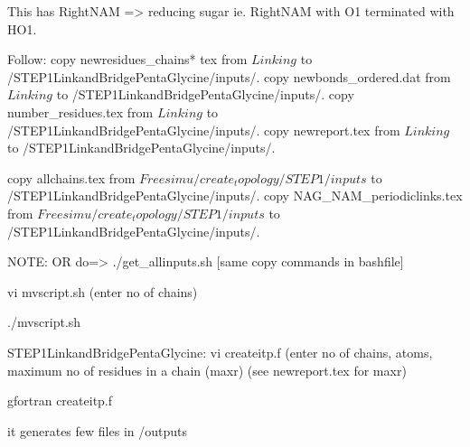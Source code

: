 This has RightNAM => reducing sugar ie. RightNAM with O1 terminated with HO1.

Follow:
copy newresidues_chains* tex          from $Linking$ to /STEP1LinkandBridgePentaGlycine/inputs/. 
copy newbonds_ordered.dat             from $Linking$ to /STEP1LinkandBridgePentaGlycine/inputs/.
copy number_residues.tex              from $Linking$ to /STEP1LinkandBridgePentaGlycine/inputs/.
copy newreport.tex                    from $Linking$ to /STEP1LinkandBridgePentaGlycine/inputs/.

copy allchains.tex                    from $Freesimu/create_topology/STEP1/inputs$  to  /STEP1LinkandBridgePentaGlycine/inputs/.
copy NAG_NAM_periodiclinks.tex        from $Freesimu/create_topology/STEP1/inputs$  to  /STEP1LinkandBridgePentaGlycine/inputs/.

NOTE: OR do=>  ./get_allinputs.sh  [same copy commands in bashfile]


vi mvscript.sh  (enter no of chains)

./mvscript.sh 

STEP1LinkandBridgePentaGlycine:  vi createitp.f  
            (enter no of chains, atoms, maximum no of residues in a chain (maxr) (see newreport.tex for maxr)

gfortran createitp.f 

it generates few files in /outputs
